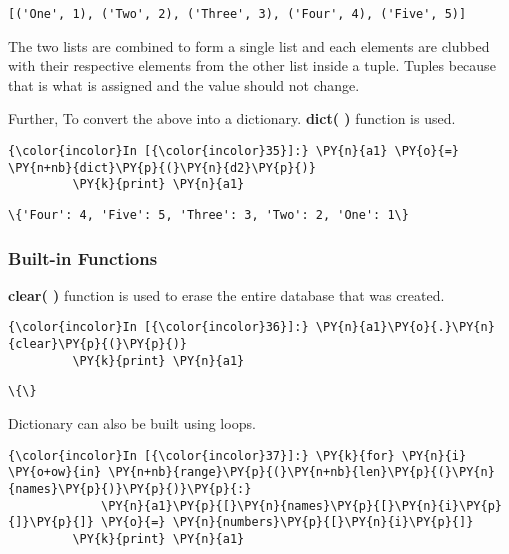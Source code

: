     \begin{Verbatim}[commandchars=\\\{\}]
[('One', 1), ('Two', 2), ('Three', 3), ('Four', 4), ('Five', 5)]
    \end{Verbatim}

    The two lists are combined to form a single list and each elements are
clubbed with their respective elements from the other list inside a
tuple. Tuples because that is what is assigned and the value should not
change.

Further, To convert the above into a dictionary. \textbf{dict( )}
function is used.

    \begin{Verbatim}[commandchars=\\\{\}]
{\color{incolor}In [{\color{incolor}35}]:} \PY{n}{a1} \PY{o}{=} \PY{n+nb}{dict}\PY{p}{(}\PY{n}{d2}\PY{p}{)}
         \PY{k}{print} \PY{n}{a1}
\end{Verbatim}

    \begin{Verbatim}[commandchars=\\\{\}]
\{'Four': 4, 'Five': 5, 'Three': 3, 'Two': 2, 'One': 1\}
    \end{Verbatim}

    \subsubsection{Built-in Functions}\label{built-in-functions}

    \textbf{clear( )} function is used to erase the entire database that was
created.

    \begin{Verbatim}[commandchars=\\\{\}]
{\color{incolor}In [{\color{incolor}36}]:} \PY{n}{a1}\PY{o}{.}\PY{n}{clear}\PY{p}{(}\PY{p}{)}
         \PY{k}{print} \PY{n}{a1}
\end{Verbatim}

    \begin{Verbatim}[commandchars=\\\{\}]
\{\}
    \end{Verbatim}

    Dictionary can also be built using loops.

    \begin{Verbatim}[commandchars=\\\{\}]
{\color{incolor}In [{\color{incolor}37}]:} \PY{k}{for} \PY{n}{i} \PY{o+ow}{in} \PY{n+nb}{range}\PY{p}{(}\PY{n+nb}{len}\PY{p}{(}\PY{n}{names}\PY{p}{)}\PY{p}{)}\PY{p}{:}
             \PY{n}{a1}\PY{p}{[}\PY{n}{names}\PY{p}{[}\PY{n}{i}\PY{p}{]}\PY{p}{]} \PY{o}{=} \PY{n}{numbers}\PY{p}{[}\PY{n}{i}\PY{p}{]}
         \PY{k}{print} \PY{n}{a1}
\end{Verbatim}

